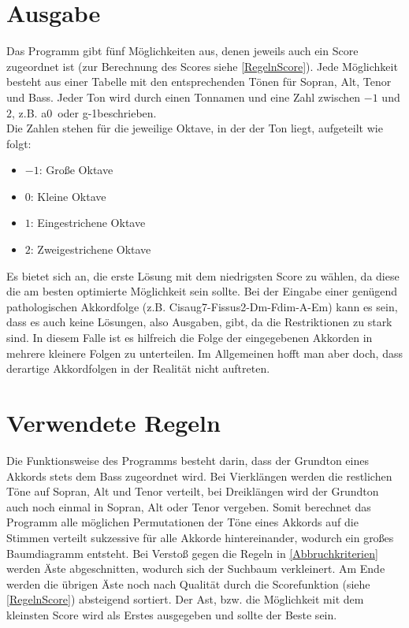 \documentclass[11.5pt,a4paper]{article}
\begin{document}
\section{Ausgabe}\label{Ausgabe}
Das Programm gibt fünf Möglichkeiten aus, denen jeweils auch ein Score zugeordnet ist (zur Berechnung des Scores siehe \ref{RegelnScore}). Jede Möglichkeit besteht aus
einer Tabelle mit den entsprechenden Tönen für Sopran, Alt, Tenor und Bass. Jeder Ton wird durch einen Tonnamen und eine Zahl zwischen $-1$ und $2$, z.B. \glqq a0\grqq \ oder \glqq g-1\grqq beschrieben. \\
Die Zahlen stehen für die jeweilige Oktave, in der der Ton liegt, aufgeteilt wie folgt:

\begin{itemize}
	\item $-1$: Große Oktave
	\item $0$: Kleine Oktave
	\item $1$: Eingestrichene Oktave
	\item $2$: Zweigestrichene Oktave
\end{itemize}
Es bietet sich an, die erste Lösung mit dem niedrigsten Score zu wählen, da diese die am besten optimierte Möglichkeit sein sollte. 
Bei der Eingabe einer genügend pathologischen Akkordfolge (z.B. Cisaug7-Fissus2-Dm-Fdim-A-Em) kann es sein, dass es auch keine \glqq Lösungen\grqq, also Ausgaben, gibt, da die Restriktionen zu stark sind. In diesem Falle ist es hilfreich die Folge der eingegebenen Akkorden in mehrere kleinere Folgen zu unterteilen. Im Allgemeinen hofft man aber doch, dass derartige Akkordfolgen in der Realität nicht auftreten. 

	
\section{Verwendete Regeln}
Die Funktionsweise des Programms besteht darin, dass der Grundton eines Akkords stets dem Bass zugeordnet wird. Bei Vierklängen werden die restlichen Töne auf Sopran, Alt und Tenor verteilt, bei Dreiklängen wird der Grundton auch noch einmal in Sopran, Alt oder Tenor vergeben. Somit berechnet das Programm alle möglichen Permutationen der Töne eines Akkords auf die Stimmen verteilt sukzessive für alle Akkorde hintereinander, wodurch ein großes Baumdiagramm entsteht. Bei Verstoß gegen die Regeln in \ref{Abbruchkriterien} werden Äste abgeschnitten, wodurch sich der Suchbaum verkleinert. Am Ende werden die übrigen Äste noch nach Qualität durch die Scorefunktion (siehe \ref{RegelnScore}) absteigend sortiert. Der Ast, bzw. die Möglichkeit mit dem kleinsten Score wird als Erstes ausgegeben und sollte der Beste sein. 
\end{document}
